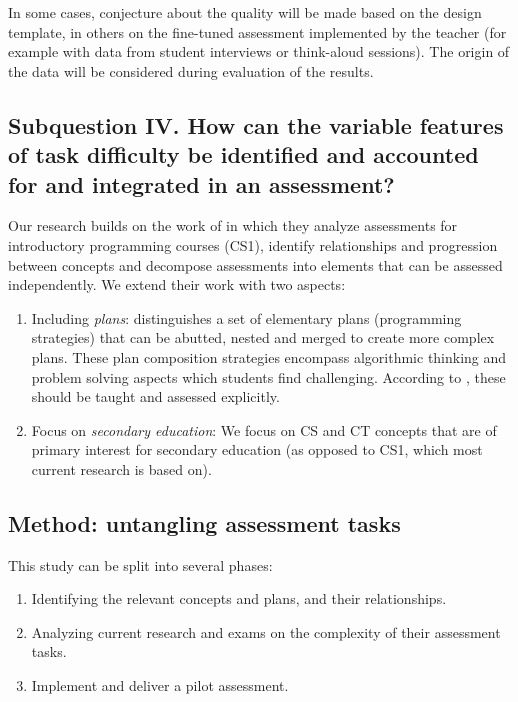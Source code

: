 
In some cases, conjecture about the quality will be made based on the design template, in others on the fine-tuned assessment implemented by the teacher (for example with data from student interviews or think-aloud sessions). The origin of the data will be considered during evaluation of the results.


\subsection{Subquestion IV. How can the variable features of task difficulty be identified and accounted for and integrated in an assessment?}%


Our research builds on the work of  in which they analyze assessments for introductory programming courses (CS1), identify relationships and progression between concepts and decompose assessments into elements that can be assessed independently. We extend their work with two aspects:
\begin{enumerate}
\item Including \emph{plans}:  distinguishes a set of elementary plans (programming strategies) that can be abutted, nested and merged to create more complex plans. These plan composition strategies encompass algorithmic thinking and problem solving aspects which students find challenging. According to \citeauthor{deRaadt2009teachingPlans}, these should be taught and assessed explicitly.


\item Focus on \emph{secondary education}: We focus on CS and CT concepts that are of primary interest for secondary education (as opposed to CS1, which most current research is based on).

\end{enumerate}


\subsection{Method: untangling assessment tasks}

This study can be split into several phases:
\begin{enumerate}
\item Identifying the relevant concepts and plans, and their relationships.
\item Analyzing current research and exams on the complexity of their assessment tasks.
\item Implement and deliver a pilot assessment.
\end{enumerate}

